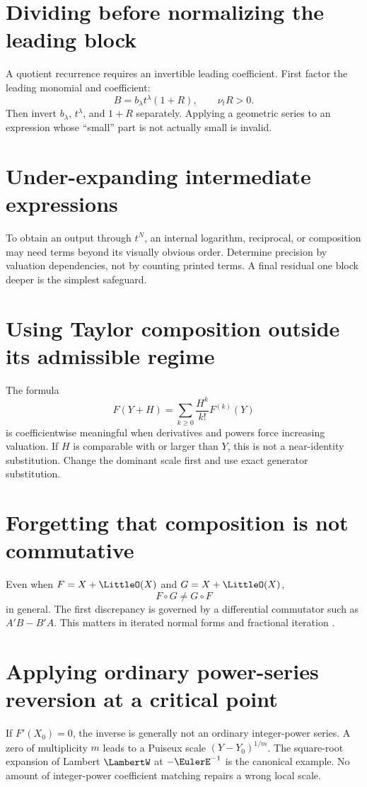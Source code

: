 \documentclass[11pt,oneside]{book}
\theoremstyle{definition}
\theoremstyle{remark}
\newcommand{\compose}{\mathbin{\circ}}
\begin{document}
\section{Dividing before normalizing the leading block}
A quotient recurrence requires an invertible leading coefficient. First
factor the leading monomial and coefficient:
\[
 B=b_\lambda t^\lambda(1+R),\qquad \nu_tR>0.
\]
Then invert $b_\lambda$, $t^\lambda$, and $1+R$ separately. Applying a
geometric series to an expression whose ``small'' part is not actually
small is invalid.

\section{Under-expanding intermediate expressions}
To obtain an output through $t^N$, an internal logarithm, reciprocal, or
composition may need terms beyond its visually obvious order. Determine
precision by valuation dependencies, not by counting printed terms.
A final residual one block deeper is the simplest safeguard.

\section{Using Taylor composition outside its admissible regime}
The formula
\[
 F(Y+H)=\sum_{k\ge0}\frac{H^k}{k!}F^{(k)}(Y)
\]
is coefficientwise meaningful when derivatives and powers force increasing
valuation. If $H$ is comparable with or larger than $Y$, this is not a
near-identity substitution. Change the dominant scale first and use exact
generator substitution.

\section{Forgetting that composition is not commutative}
Even when $F=X+\LittleO(X)$ and $G=X+\LittleO(X)$,
\[
 F\compose G\ne G\compose F
\]
in general. The first discrepancy is governed by a differential
commutator such as $A'B-B'A$. This matters in iterated normal forms and
fractional iteration \cite{EdgarFractional}.

\section{Applying ordinary power-series reversion at a critical point}
If $F'(X_0)=0$, the inverse is generally not an ordinary integer-power
series. A zero of multiplicity $m$ leads to a Puiseux scale
$(Y-Y_0)^{1/m}$. The square-root expansion of Lambert $\LambertW$ at
$-\EulerE^{-1}$ is the canonical example. No amount of integer-power
coefficient matching repairs a wrong local scale.
\end{document}
